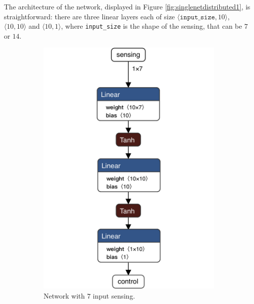 The architecture of the network, displayed in Figure 
\ref{fig:singlenetdistributed1}, is straightforward: there are three linear 
layers each of size $\langle\mathtt{input\_size}, 10\rangle$,  $\langle 10, 
10\rangle$ and $\langle 10, 1\rangle$, where \texttt{input\_size} is the 
shape of the sensing, that can be $7$ or $14$.
\begin{figure}[htb]
	\centering
	\begin{subfigure}[h]{0.495\textwidth}
		\centering
		\includegraphics[width=.8\textwidth]{contents/images/task1distributed@4x}%
		\caption{Network with $7$ input sensing.}
		\label{fig:singlenet7distributed1}
	\end{subfigure}
	\hfill
	\begin{subfigure}[h]{0.495\textwidth}
		\centering

\end{subfigure}
\end{figure}
